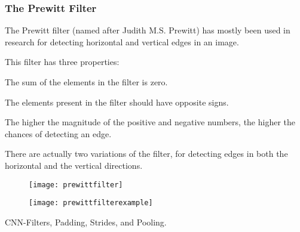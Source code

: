	\subsubsection{The Prewitt Filter}
	\begin{bulletedlist}
		\item The Prewitt filter (named after Judith M.S. Prewitt) has mostly been used in research for detecting horizontal and vertical edges in an image.
		\item This filter has three properties:
		\begin{bulletedlist}
			\item The sum of the elements in the filter is zero.
			\item The elements present in the filter should have opposite signs.
			\item The higher the magnitude of the positive and negative numbers, the higher the chances of detecting an edge.
		\end{bulletedlist}
		\item There are actually two variations of the filter, for detecting edges in both the horizontal and the vertical
directions.
	\end{bulletedlist}

	\begin{figure}[h]
		\centering
		\texttt{[image: prewittfilter]}
		\caption{}
		\label{fig:prewittfilter}
	\end{figure}
	\begin{figure}[h]
		\centering
		\texttt{[image: prewittfilterexample]}
		\caption{}
		\label{fig:prewittfilterexample}
	\end{figure}






CNN-Filters, Padding, Strides, and Pooling. 
